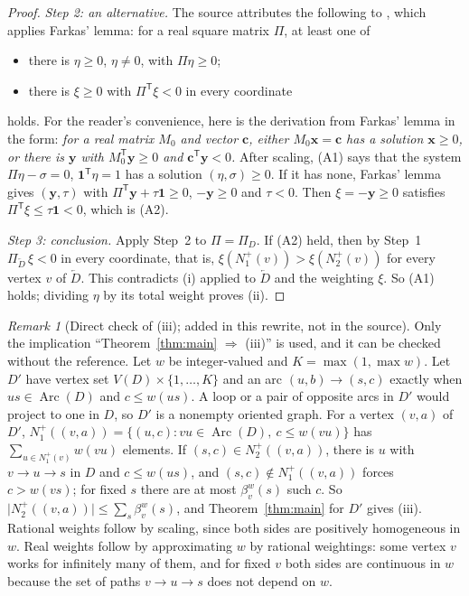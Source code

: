 \documentclass[11pt]{article}
\theoremstyle{remark}
\newtheorem{remark}[theorem]{Remark}
\newcommand{\abs}[1]{\lvert #1\rvert}
\DeclareMathOperator{\Arc}{Arc}
\newcommand{\tp}{^{\mathsf T}}
\begin{document}
\begin{proof}
\emph{Step 2: an alternative.} The source attributes the following to
\cite[Theorem~1]{Seacrest2015}, which applies Farkas' lemma: for a real
square matrix $\Pi$, at least one of
\begin{itemize}[leftmargin=2.5em]
\item[(A1)] there is $\eta\ge0$, $\eta\ne0$, with $\Pi\eta\ge0$;
\item[(A2)] there is $\xi\ge0$ with $\Pi\tp\xi<0$ in every coordinate
\end{itemize}
holds. For the reader's convenience, here is the derivation from Farkas'
lemma in the form: \emph{for a real matrix $M_0$ and vector $\mathbf c$,
either $M_0\mathbf x=\mathbf c$ has a solution $\mathbf x\ge0$, or there is
$\mathbf y$ with $M_0\tp\mathbf y\ge0$ and $\mathbf c\tp\mathbf y<0$.}
After scaling, (A1) says that the system
$\Pi\eta-\sigma=0$, $\mathbf 1\tp\eta=1$ has a solution
$(\eta,\sigma)\ge0$. If it has none, Farkas' lemma gives
$(\mathbf y,\tau)$ with $\Pi\tp\mathbf y+\tau\mathbf 1\ge0$,
$-\mathbf y\ge0$ and $\tau<0$. Then $\xi=-\mathbf y\ge0$ satisfies
$\Pi\tp\xi\le\tau\mathbf 1<0$, which is (A2).

\emph{Step 3: conclusion.} Apply Step~2 to $\Pi=\Pi_D$. If (A2) held, then
by Step~1 $\Pi_{\overleftarrow D}\,\xi<0$ in every coordinate, that is,
$\xi(N_1^+(v))>\xi(N_2^+(v))$ for every vertex $v$ of $\overleftarrow D$.
This contradicts \textup{(i)} applied to $\overleftarrow D$ and the
weighting $\xi$. So (A1) holds; dividing $\eta$ by its total weight proves
\textup{(ii)}.
\end{proof}

\begin{remark}[Direct check of \textup{(iii)}; added in this rewrite, not in the source]
\label{rem:arc-check}
Only the implication ``Theorem~\ref{thm:main} $\Rightarrow$ \textup{(iii)}''
is used, and it can be checked without the reference. Let $w$ be
integer-valued and $K=\max(1,\max w)$. Let $D'$ have vertex set
$V(D)\times\{1,\dots,K\}$ and an arc $(u,b)\to(s,c)$ exactly when
$us\in\Arc(D)$ and $c\le w(us)$. A loop or a pair of opposite arcs in $D'$
would project to one in $D$, so $D'$ is a nonempty oriented graph. For a
vertex $(v,a)$ of $D'$,
$N_1^+((v,a))=\{(u,c):vu\in\Arc(D),\ c\le w(vu)\}$ has
$\sum_{u\in N_1^+(v)}w(vu)$ elements. If $(s,c)\in N_2^+((v,a))$, there is
$u$ with $v\to u\to s$ in $D$ and $c\le w(us)$, and
$(s,c)\notin N_1^+((v,a))$ forces $c>w(vs)$; for fixed $s$ there are at
most $\beta_v^w(s)$ such $c$. So
$\abs{N_2^+((v,a))}\le\sum_s\beta_v^w(s)$, and Theorem~\ref{thm:main} for
$D'$ gives \textup{(iii)}. Rational weights follow by scaling, since both
sides are positively homogeneous in $w$. Real weights follow by
approximating $w$ by rational weightings: some vertex $v$ works for
infinitely many of them, and for fixed $v$ both sides are continuous in $w$
because the set of paths $v\to u\to s$ does not depend on $w$.
\end{remark}
\end{document}
